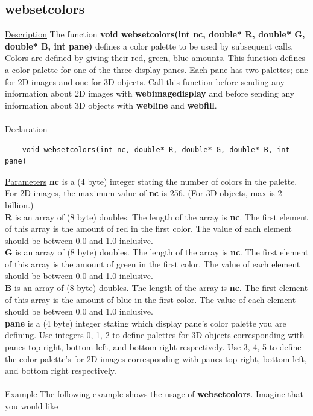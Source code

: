 \subsection{websetcolors}
\underline{Description} The function \textbf{void websetcolors(int nc, double* R, double* G, double* B, int pane)} 
defines a color palette to be used by subsequent calls. Colors are defined by giving their red, green, blue amounts.
This function defines a color palette for one of the three display panes. Each pane has two palettes; one for 2D images and
one for 3D objects. Call this function before sending any information about
2D images with \textbf{webimagedisplay} and before sending any information about 3D objects with \textbf{webline} and
\textbf{webfill}.\\
\\
\underline{Declaration} 
\begin{verbatim} 
    void websetcolors(int nc, double* R, double* G, double* B, int pane)
\end{verbatim}
\underline{Parameters} \textbf{nc} is a (4 byte) integer stating the number of colors in the palette. 
For 2D images, the maximum value of \textbf{nc} is 256. (For 3D objects, max is 2 billion.)\\
\textbf{R} is an array of (8 byte) doubles. The length of the array is \textbf{nc}. The first element of this array
is the amount of red in the first color. The value of each element should be between 0.0 and 1.0 inclusive.\\
\textbf{G} is an array of (8 byte) doubles. The length of the array is \textbf{nc}. The first element of this array
is the amount of green in the first color.  The value of each element should be between 0.0 and 1.0 inclusive.\\
\textbf{B} is an array of (8 byte) doubles. The length of the array is \textbf{nc}. The first element of this array
is the amount of blue in the first color.  The value of each element should be between 0.0 and 1.0 inclusive.\\
\textbf{pane} is a (4 byte) integer stating which display pane's color palette you are defining. Use integers
0, 1, 2 to define palettes for 3D objects corresponding with panes top right, bottom left, and bottom right respectively. 
Use 3, 4, 5 to define the color palette's for 2D images corresponding with panes top right, bottom left, and bottom 
right respectively.\\
\\
\underline{Example} The following example shows the usage of \textbf{websetcolors}. Imagine that you would like
